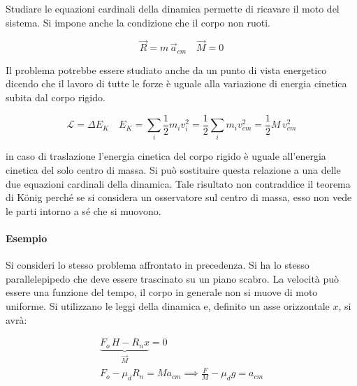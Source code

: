\begin{figure}[htpb]
\end{figure}
\FloatBarrier
Studiare le equazioni cardinali della dinamica permette di ricavare il moto del sistema. Si impone anche la condizione che il corpo non ruoti.

\[
	\vec{R} = m\,\vec{a}_{cm} 	\quad \vec{M} = 0
\]

Il problema potrebbe essere studiato anche da un punto di vista energetico dicendo che il lavoro di tutte le forze è uguale alla variazione di energia cinetica subita dal corpo rigido.

\[
	\mathcal{L} = \Delta E_K \quad E_K = \sum_i \frac{1}{2}  m_i v_i^2  = \frac{1}{2} \sum_i m_i v_{cm}^2  = \frac{1}{2} M\,v_{cm}^2
\]

in caso di traslazione l'energia cinetica del corpo rigido è uguale all'energia cinetica del solo centro di massa. Si può sostituire questa relazione a una delle due equazioni cardinali della dinamica. Tale risultato non contraddice il teorema di K\"onig perché se si considera un osservatore sul centro di massa, esso non vede le parti intorno a sé che si muovono.

\paragraph{Esempio} Si consideri lo stesso problema affrontato in precedenza. Si ha lo stesso parallelepipedo che deve essere trascinato su un piano scabro. La velocità può essere una funzione del tempo, il corpo in generale non si muove di moto uniforme. Si utilizzano le leggi della dinamica e, definito un asse orizzontale $x$, si avrà:

\begin{gather*}
	\underbrace{F_o\,H - R_n x}_{\vec{M}} = 0 \\
	F_o - \mu_d R_n = Ma_{cm} \implies \frac{F}{M} - \mu_d g = a_{cm}
\end{gather*}

